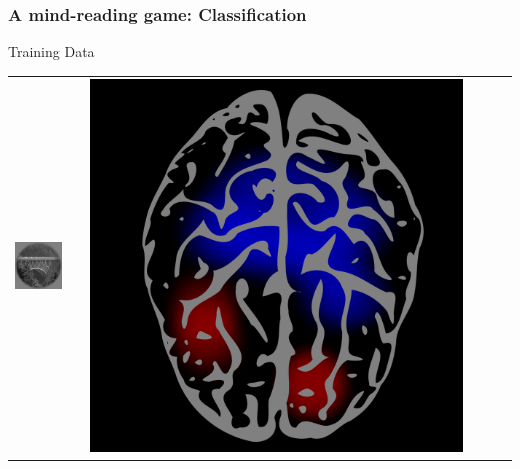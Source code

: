 \documentclass{beamer}
\begin{document}
\begin{frame}
\frametitle{A mind-reading game: Classification}
\begin{center}
Training Data
\\
\begin{tabular}{ccc||ccc}
\hline
\includegraphics[scale = .26]{img1.png} & \hspace{0.2in} & \includegraphics[scale = 0.035]{brain1.png} &

\end{tabular}
\end{center}
\end{frame}
\end{document}
